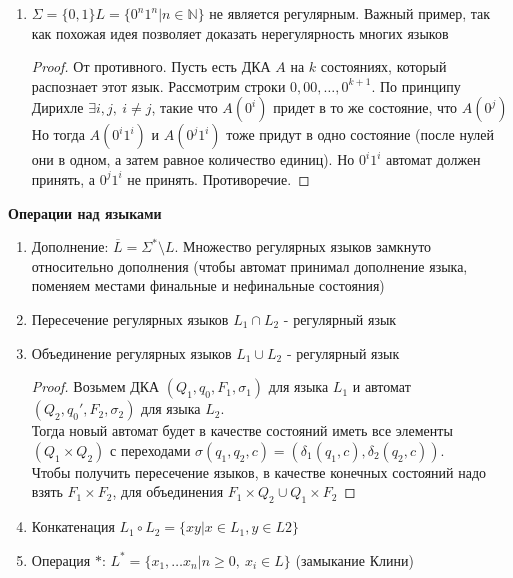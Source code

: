 \begin{enumerate}
\begin{tikzpicture}[x=0.75pt,y=0.75pt,yscale=-1,xscale=1]
    \end{tikzpicture}

    \item $\Sigma = \{0, 1\} L = \{0^n 1^n | n \in \mathbb{N}\}$ не является регулярным. 
    Важный пример, так как похожая идея позволяет доказать нерегулярность многих языков

    \begin{proof}
        От противного. Пусть есть ДКА $A$ на $k$ состояниях, который распознает этот язык. Рассмотрим строки 
        $0, 00, \dots, 0^{k+1}$. По принципу Дирихле $\exists i, j,\ i\neq j$, такие что $A(0^i)$ придет в то же состояние, что $A(0^j)$
        Но тогда $A(0^i 1^i)$ и $A(0^j 1^i)$ тоже придут в одно состояние (после нулей они в одном, а затем равное количество единиц). Но $0^i 1^i$ автомат должен принять, а $0^j 1^i$ не принять. Противоречие.
    \end{proof}

\end{enumerate}

\textbf{Операции над языками}
\begin{enumerate}
    \item Дополнение: $\overline L = \Sigma^* \setminus L$. Множество регулярных языков замкнуто относительно дополнения (чтобы автомат принимал дополнение языка, поменяем местами финальные и нефинальные состояния)
    \item Пересечение регулярных языков $L_1 \cap L_2$ - регулярный язык
    \item Объединение регулярных языков $L_1 \cup L_2$ - регулярный язык\\
    \begin{proof}
        Возьмем ДКА $(Q_1, q_0, F_1, \sigma_1)$ для языка $L_1$ и автомат $(Q_2, q_0', F_2, \sigma_2)$ для языка $L_2$.\\
        Тогда новый автомат будет в качестве состояний иметь все элементы $(Q_1 \times Q_2)$ с переходами $\sigma(q_1, q_2, c) = (\delta_1(q_1, c), \delta_2(q_2, c))$.\\
        Чтобы получить пересечение языков, в качестве конечных состояний надо взять $F_1 \times F_2$, для объединения $F_1 \times Q_2 \cup Q_1 \times F_2$
    \end{proof}
    \item Конкатенация $L_1 \circ L_2 = \{ xy | x \in L_1, y \in L2\}$
    \item Операция $*$: $L^* = \{x_1, \dots x_n | n \geq 0,\ x_i \in L\}$ (замыкание Клини)
\end{enumerate}


